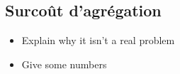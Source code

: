 \subsection{Surcoût d'agrégation}


  \begin{itemize}
    \item Explain why it isn't a real problem
    \item Give some numbers
  \end{itemize}
